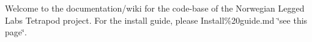 Welcome to the documentation/wiki for the code-\/base of the Norwegian Legged Lab\textquotesingle{}s Tetrapod project. For the install guide, please Install\%20guide.\+md \char`\"{}see this page\char`\"{}. 